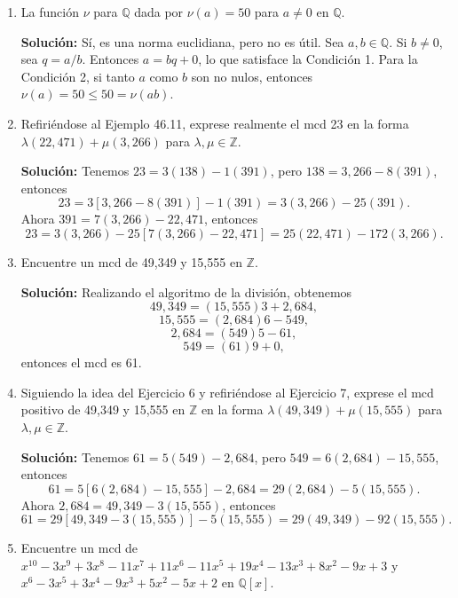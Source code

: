 \begin{enumerate}
    \item La función \( \nu \) para \( \mathbb{Q} \) dada por \( \nu(a) = 50 \) para \( a \neq 0 \) en \( \mathbb{Q} \).
    
    \textbf{Solución:} Sí, es una norma euclidiana, pero no es útil. Sea \( a, b \in \mathbb{Q} \). Si \( b \neq 0 \), sea \( q = a/b \). Entonces \( a = bq + 0 \), lo que satisface la Condición 1. Para la Condición 2, si tanto \( a \) como \( b \) son no nulos, entonces \( \nu(a) = 50 \leq 50 = \nu(ab) \).
    
    \item Refiriéndose al Ejemplo 46.11, exprese realmente el mcd 23 en la forma \( \lambda(22,471) + \mu(3,266) \) para \( \lambda, \mu \in \mathbb{Z} \).
    
    \textbf{Solución:} Tenemos \( 23 = 3(138) - 1(391) \), pero \( 138 = 3,266 - 8(391) \), entonces
    \[
    23 = 3[3,266 - 8(391)] - 1(391) = 3(3,266) - 25(391).
    \]
    Ahora \( 391 = 7(3,266) - 22,471 \), entonces
    \[
    23 = 3(3,266) - 25[7(3,266) - 22,471] = 25(22,471) - 172(3,266).
    \]
    
    \item Encuentre un mcd de 49,349 y 15,555 en \( \mathbb{Z} \).
    
    \textbf{Solución:} Realizando el algoritmo de la división, obtenemos
    \[
    49,349 = (15,555)3 + 2,684,
    \]
    \[
    15,555 = (2,684)6 - 549,
    \]
    \[
    2,684 = (549)5 - 61,
    \]
    \[
    549 = (61)9 + 0,
    \]
    entonces el mcd es 61.
    
    \item Siguiendo la idea del Ejercicio 6 y refiriéndose al Ejercicio 7, exprese el mcd positivo de 49,349 y 15,555 en \( \mathbb{Z} \) en la forma \( \lambda(49,349) + \mu(15,555) \) para \( \lambda, \mu \in \mathbb{Z} \).
    
    \textbf{Solución:} Tenemos \( 61 = 5(549) - 2,684 \), pero \( 549 = 6(2,684) - 15,555 \), entonces
    \[
    61 = 5[6(2,684) - 15,555] - 2,684 = 29(2,684) - 5(15,555).
    \]
    Ahora \( 2,684 = 49,349 - 3(15,555) \), entonces
    \[
    61 = 29[49,349 - 3(15,555)] - 5(15,555) = 29(49,349) - 92(15,555).
    \]
    
    \item Encuentre un mcd de \( x^{10} - 3x^9 + 3x^8 - 11x^7 + 11x^6 - 11x^5 + 19x^4 - 13x^3 + 8x^2 - 9x + 3 \) y \( x^6 - 3x^5 + 3x^4 - 9x^3 + 5x^2 - 5x + 2 \) en \( \mathbb{Q}[x] \).
    

\end{enumerate}
